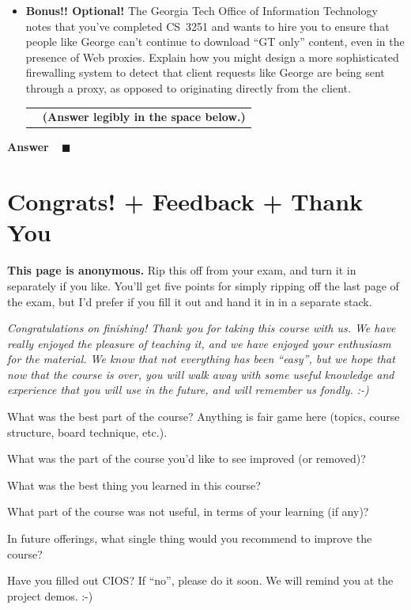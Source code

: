 \documentclass[11pt]{article}
\newcounter{pctr}
\newcommand{\ansbelow}{\probnote{Answer legibly in the space below.}}
\newcommand{\sols}[1]{#1}
\newcommand{\sols}[1]{}
\newcounter{answer}
\newenvironment{answer}[1][\relax]{\refstepcounter{answer}\begin{list}%
 {}{\leftmargin 0pt\rightmargin 0pt\labelsep 3pt\parsep 0pt%
 \setlength{\listparindent}{\parindent}}
    \item {\bf Answer \theanswer #1}\
    }{\hspace*{\fill}$\blacksquare$\end{list}}
\newcommand\prob[1]%
  {\begin{itemize}\item[]%
   \vspace{.2in}{\bf\thepctr. ~[#1~ points]:}\stepcounter{pctr}}
\newcommand\eprob{\end{itemize}}
\newcommand\probnote[1]%
  {\\\begin{tabular}{cr} \hspace{3in} & {\bf (#1)} \\ \end{tabular}}
\begin{document}
\newpage
\prob{5} {\bf Bonus!! Optional!} The Georgia Tech Office of Information
Technology notes that you've completed CS~3251 and wants to hire you to
ensure that people like George can't continue to download ``GT only''
content, even in the presence of Web proxies.  Explain how you might
design a more sophisticated firewalling system to detect that client
requests like George are being sent through a proxy, as opposed to
originating directly from the client.
~\ansbelow \eprob
\vspace*{1.25in}
\sols{
\begin{answer}
\end{answer}
}





\newpage
\section*{Congrats! + Feedback + Thank You}
{\bf This page is anonymous.}  Rip this off from your exam, and turn it
in separately if you like.  You'll get five points for simply ripping
off the last page of the exam, but I'd prefer if you fill it out and
hand it in in a separate stack.

{\it Congratulations on finishing! Thank you for taking
this course with us.  We have really enjoyed the pleasure of teaching
it, and we have enjoyed your enthusiasm for the material.  We know that
not everything has been ``easy'', but we hope that now that the course
is over, you will walk away with some useful knowledge and experience
that you will use in the future, and will remember us fondly. :-)}

\vspace*{0.5in}

What was the best part of the course?  Anything is
fair game here (topics, course structure, board technique, etc.).
\vspace{0.5in}

What was the part of the course you'd like to see improved (or removed)?
\vspace{0.5in}

What was the best thing you learned in this course?
\vspace{0.5in}

What part of the course was not useful, in terms of your learning (if any)?
\vspace{0.5in}


In future offerings, what single thing would you recommend to improve
the course?
\vspace{0.5in}

Have you filled out CIOS?  If ``no'', please do it soon.  We will remind
you at the project demos. :-)




\label{lastpage}
\end{document}
